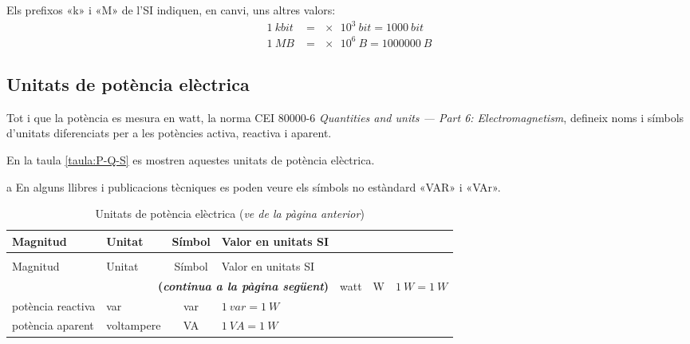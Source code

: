 Els prefixos «k» i «M» de l'SI indiquen, en canvi, uns altres valors:
\begin{align*}
	\qty{1}{kbit} &= \qty[print-unity-mantissa = false]{e3}{bit} = \qty{1000}{bit} \\
	\qty{1}{MB} &=\qty[print-unity-mantissa = false]{e6}{B} = \qty{1000000}{B}
\end{align*}


\subsection{Unitats de potència elèctrica}

Tot i que la potència es mesura en watt, la norma CEI 80000-6 \textit{Quantities and units --- Part 6: Electromagnetism}, defineix noms i símbols d'unitats diferenciats per a les potències activa, reactiva i aparent.

En la taula \vref{taula:P-Q-S} es mostren aquestes unitats de potència elèctrica.

\begin{ThreePartTable}
	\begin{TableNotes}
		\item[a] {\footnotesize En alguns llibres i publicacions tècniques es poden veure els símbols no estàndard «VAR» i «VAr».}
	\end{TableNotes}
\begin{longtable}[h]{llcl}
   \caption{\label{taula:P-Q-S} Unitats de potència elèctrica}\\
   \toprule[1pt]
    Magnitud & Unitat &  Símbol & Valor en unitats SI \\
   \midrule
   \endfirsthead
   \caption[]{Unitats de potència elèctrica (\emph{ve de la pàgina anterior})}\\
   \toprule[1pt]
    Magnitud & Unitat &  Símbol & Valor en unitats SI \\
   \midrule
   \endhead
   \midrule
   \multicolumn{4}{r}{\sffamily\bfseries\color{NavyBlue}(\emph{continua a la pàgina següent})}
   \endfoot
   \insertTableNotes
   \endlastfoot
   potència activa & watt &  \unit{W}& $\qty{1}{W} = \qty{1}{W}$  \\
   potència reactiva & var &  \unit{var}\tnote{a} & $\qty{1}{var} = \qty{1}{W}$  \\
   potència aparent & voltampere &  \unit{VA}& $\qty{1}{VA} = \qty{1}{W}$  \\
   \bottomrule[1pt]
\end{longtable}
\end{ThreePartTable}




